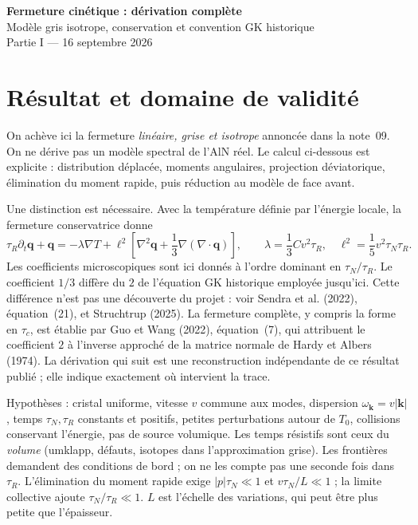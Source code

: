 \documentclass[11pt,a4paper]{article}
\begin{document}
\begin{center}
{\Large\bfseries Fermeture cinétique : dérivation complète}\\[4pt]
{\normalsize Modèle gris isotrope, conservation et convention GK historique}\\[2pt]
{\small Partie I --- 16 septembre 2026}
\end{center}

\section{Résultat et domaine de validité}
On achève ici la fermeture \emph{linéaire, grise et isotrope} annoncée dans la note~09.
On ne dérive pas un modèle spectral de l'AlN réel. Le calcul ci-dessous est explicite :
distribution déplacée, moments angulaires, projection déviatorique, élimination du
moment rapide, puis réduction au modèle de face avant.

Une distinction est nécessaire. Avec la température définie par l'énergie locale,
la fermeture conservatrice donne
\[
 \tau_R\partial_t\mathbf q+\mathbf q=-\lambda\nabla T+
 \ell^2\left[\nabla^2\mathbf q+\frac13\nabla(\nabla\cdot\mathbf q)\right],
 \qquad
 \lambda=\frac13Cv^2\tau_R,\quad
 \ell^2=\frac15v^2\tau_N\tau_R .
\]
Les coefficients microscopiques sont ici donnés à l'ordre dominant en
$\tau_N/\tau_R$. Le coefficient $1/3$ diffère du $2$ de l'équation GK
historique employée jusqu'ici. Cette différence n'est pas une découverte du
projet : voir Sendra et al. (2022), équation~(21), et Struchtrup (2025).
La fermeture complète, y compris la forme en $\tau_c$, est établie par
Guo et Wang (2022), équation~(7), qui attribuent le coefficient $2$ à
l'inverse approché de la matrice normale de Hardy et Albers (1974).
La dérivation qui suit est une reconstruction indépendante de ce résultat
publié ; elle indique exactement où intervient la trace.

Hypothèses : cristal uniforme, vitesse $v$ commune aux modes, dispersion
$\omega_{\mathbf k}=v|\mathbf k|$, temps $\tau_N,\tau_R$ constants et positifs,
petites perturbations autour de $T_0$, collisions conservant l'énergie,
pas de source volumique. Les temps résistifs sont ceux du \emph{volume}
(umklapp, défauts, isotopes dans l'approximation grise). Les frontières demandent
des conditions de bord ; on ne les compte pas une seconde fois dans $\tau_R$.
L'élimination du moment rapide exige $|p|\tau_N\ll1$ et
$v\tau_N/L\ll1$ ; la limite collective ajoute $\tau_N/\tau_R\ll1$.
$L$ est l'échelle des variations, qui peut être plus petite que l'épaisseur.
\end{document}

